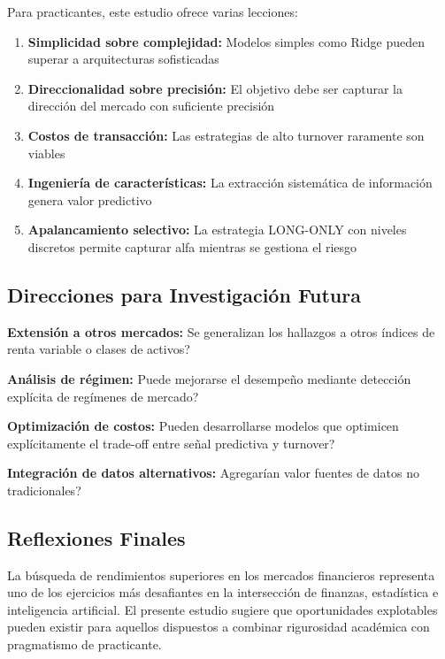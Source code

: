 \documentclass[11pt,a4paper]{article}
\begin{document}
Para practicantes, este estudio ofrece varias lecciones:

\begin{enumerate}[noitemsep]
    \item \textbf{Simplicidad sobre complejidad:} Modelos simples como Ridge pueden superar a arquitecturas sofisticadas
    \item \textbf{Direccionalidad sobre precisi\'on:} El objetivo debe ser capturar la direcci\'on del mercado con suficiente precisi\'on
    \item \textbf{Costos de transacci\'on:} Las estrategias de alto turnover raramente son viables
    \item \textbf{Ingenier\'ia de caracter\'isticas:} La extracci\'on sistem\'atica de informaci\'on genera valor predictivo
    \item \textbf{Apalancamiento selectivo:} La estrategia LONG-ONLY con niveles discretos permite capturar alfa mientras se gestiona el riesgo
\end{enumerate}

\subsection{Direcciones para Investigaci\'on Futura}

\textbf{Extensi\'on a otros mercados:} \textquestiondown Se generalizan los hallazgos a otros \'indices de renta variable o clases de activos?

\textbf{An\'alisis de r\'egimen:} \textquestiondown Puede mejorarse el desempe\~no mediante detecci\'on expl\'icita de reg\'imenes de mercado?

\textbf{Optimizaci\'on de costos:} \textquestiondown Pueden desarrollarse modelos que optimicen expl\'icitamente el trade-off entre se\~nal predictiva y turnover?

\textbf{Integraci\'on de datos alternativos:} \textquestiondown Agregar\'ian valor fuentes de datos no tradicionales?

\subsection{Reflexiones Finales}

La b\'usqueda de rendimientos superiores en los mercados financieros representa uno de los ejercicios m\'as desafiantes en la intersecci\'on de finanzas, estad\'istica e inteligencia artificial. El presente estudio sugiere que oportunidades explotables pueden existir para aquellos dispuestos a combinar rigurosidad acad\'emica con pragmatismo de practicante.
\end{document}
